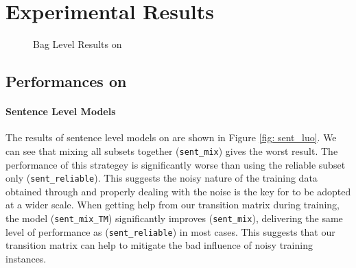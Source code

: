 \section{Experimental Results \label{sec:evaluation}}

\begin{figure}[t!]
\centering
{}
\caption{Bag Level Results on \TimeRE}
\label{fig: results_on_luo}
\end{figure}

\subsection{Performances on \TimeRE} \label{sec:results_in_TimeRE}

\paragraph{Sentence Level Models}
The results of sentence level models on \TimeRE are shown in Figure \ref{fig:
sent_luo}. We can see that mixing all subsets together (\texttt{sent\_mix})
gives the worst result. The performance of this strategey is significantly
worse than using the reliable subset only (\texttt{sent\_reliable}). This
suggests the noisy nature of the training data obtained through \DS and
properly dealing with the noise is the key for \DS to be adopted at a wider
scale. When getting help from our transition matrix during training, the
model (\texttt{sent\_mix\_TM}) significantly improves (\texttt{sent\_mix}),
delivering the same level of performance as (\texttt{sent\_reliable}) in most
cases. This suggests that our transition matrix can help to mitigate the bad influence of noisy training instances.


